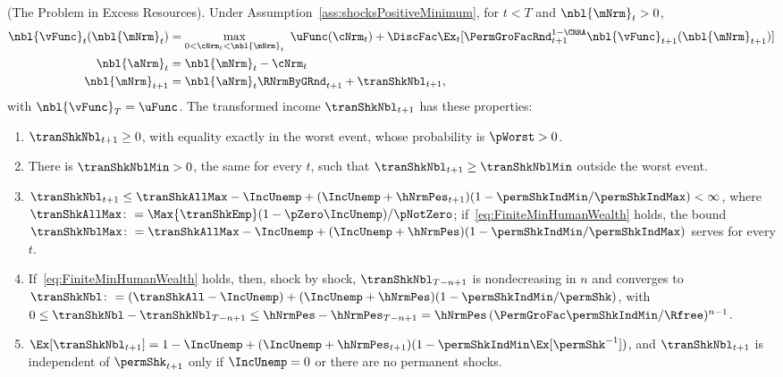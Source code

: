 \documentclass[\econtexRoot/BufferStockTheory]{subfiles}
\begin{document}
\begin{lemma}(The Problem in Excess Resources).\label{lemma:ExcessResources}
Under Assumption~\ref{ass:shocksPositiveMinimum}, for $t<T$ and $\nbl{\mNrm}_{t}>0$,
\begin{equation}\label{eq:veqnNbl}
  \begin{aligned}
    \nbl{\vFunc}_{t}(\nbl{\mNrm}_{t}) & =\max_{0<\cNrm_{t}<\nbl{\mNrm}_{t}}~\uFunc(\cNrm_{t})+\DiscFac\Ex_{t}[\PermGroFacRnd_{t+1}^{1-\CRRA}\nbl{\vFunc}_{t+1}(\nbl{\mNrm}_{t+1})] \\
    \nbl{\aNrm}_{t} & =\nbl{\mNrm}_{t}-\cNrm_{t} \\
    \nbl{\mNrm}_{t+1} & =\nbl{\aNrm}_{t}\RNrmByGRnd_{t+1}+\tranShkNbl_{t+1},
  \end{aligned}
\end{equation}
with $\nbl{\vFunc}_{T}=\uFunc$.
The transformed income $\tranShkNbl_{t+1}$ has these properties:
\begin{enumerate}[label=(\alph*)]
\item $\tranShkNbl_{t+1}\geq 0$, with equality exactly in the worst event, whose probability is $\pWorst>0$.
\item There is $\tranShkNblMin>0$, the same for every $t$, such that $\tranShkNbl_{t+1}\geq\tranShkNblMin$ outside the worst event.
\item $\tranShkNbl_{t+1}\leq\tranShkAllMax-\IncUnemp+(\IncUnemp+\hNrmPes_{t+1})(1-\permShkIndMin/\permShkIndMax)<\infty$, where $\tranShkAllMax\colon=\Max{\tranShkEmp}(1-\pZero\IncUnemp)/\pNotZero$; if~\eqref{eq:FiniteMinHumanWealth} holds, the bound $\tranShkNblMax\colon=\tranShkAllMax-\IncUnemp+(\IncUnemp+\hNrmPes)(1-\permShkIndMin/\permShkIndMax)$ serves for every $t$.
\item If~\eqref{eq:FiniteMinHumanWealth} holds, then, shock by shock, $\tranShkNbl_{T-n+1}$ is nondecreasing in $n$ and converges to $\tranShkNbl\colon=(\tranShkAll-\IncUnemp)+(\IncUnemp+\hNrmPes)(1-\permShkIndMin/\permShk)$, with
$0\leq\tranShkNbl-\tranShkNbl_{T-n+1}\leq\hNrmPes-\hNrmPes_{T-n+1}=\hNrmPes\,(\PermGroFac\permShkIndMin/\Rfree)^{n-1}$.
\item $\Ex[\tranShkNbl_{t+1}]=1-\IncUnemp+(\IncUnemp+\hNrmPes_{t+1})(1-\permShkIndMin\Ex[\permShk^{-1}])$, and $\tranShkNbl_{t+1}$ is independent of $\permShk_{t+1}$ only if $\IncUnemp=0$ or there are no permanent shocks.
\end{enumerate}
\end{lemma}
\end{document}
